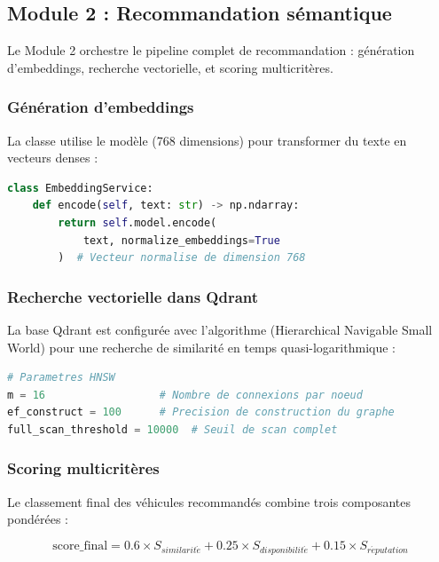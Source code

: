 \subsection{Module 2 : Recommandation sémantique}

Le Module 2 orchestre le pipeline complet de recommandation : génération d'embeddings, recherche vectorielle, et scoring multicritères.

\subsubsection{Génération d'embeddings}

La classe  utilise le modèle  (768 dimensions) pour transformer du texte en vecteurs denses :

\begin{lstlisting}[language=Python, caption={Génération d'embeddings vectoriels}]
class EmbeddingService:
    def encode(self, text: str) -> np.ndarray:
        return self.model.encode(
            text, normalize_embeddings=True
        )  # Vecteur normalise de dimension 768
\end{lstlisting}

\subsubsection{Recherche vectorielle dans Qdrant}

La base Qdrant est configurée avec l'algorithme  (Hierarchical Navigable Small World) pour une recherche de similarité en temps quasi-logarithmique :

\begin{lstlisting}[language=Python, caption={Configuration de la collection Qdrant}]
# Parametres HNSW
m = 16                  # Nombre de connexions par noeud
ef_construct = 100      # Precision de construction du graphe
full_scan_threshold = 10000  # Seuil de scan complet
\end{lstlisting}

\subsubsection{Scoring multicritères}

Le classement final des véhicules recommandés combine trois composantes pondérées :

\begin{equation}
\text{score\_final} = 0.6 \times S_{similarit\acute{e}} + 0.25 \times S_{disponibilit\acute{e}} + 0.15 \times S_{r\acute{e}putation}
\label{eq:scoring-recommendation}
\end{equation}


